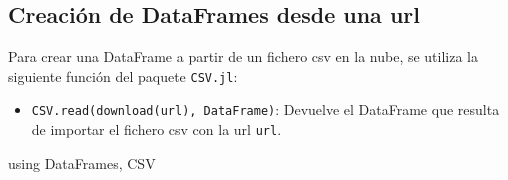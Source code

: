 \documentclass[
  letterpaper,
  DIV=11,
  numbers=noendperiod]{scrreprt}
\newenvironment{Shaded}{\begin{snugshade}}{\end{snugshade}}
\newcommand{\BuiltInTok}[1]{\textcolor[rgb]{0.00,0.23,0.31}{#1}}
\newcommand{\ImportTok}[1]{\textcolor[rgb]{0.00,0.46,0.62}{#1}}
\newcommand{\NormalTok}[1]{\textcolor[rgb]{0.00,0.23,0.31}{#1}}
\providecommand{\tightlist}{%
  \setlength{\itemsep}{0pt}\setlength{\parskip}{0pt}}\usepackage{longtable,booktabs,array}
\begin{document}
\hypertarget{creaciuxf3n-de-dataframes-desde-una-url}{%
\subsection{Creación de DataFrames desde una
url}\label{creaciuxf3n-de-dataframes-desde-una-url}}

Para crear una DataFrame a partir de un fichero csv en la nube, se
utiliza la siguiente función del paquete \texttt{CSV.jl}:

\begin{itemize}
\tightlist
\item
  \texttt{CSV.read(download(url),\ DataFrame)}: Devuelve el DataFrame
  que resulta de importar el fichero csv con la url \texttt{url}.
\end{itemize}

\begin{Shaded}
\begin{Highlighting}[]
\ImportTok{using} \BuiltInTok{DataFrames}\NormalTok{, }\BuiltInTok{CSV}


\end{Highlighting}
\end{Shaded}
\end{document}
